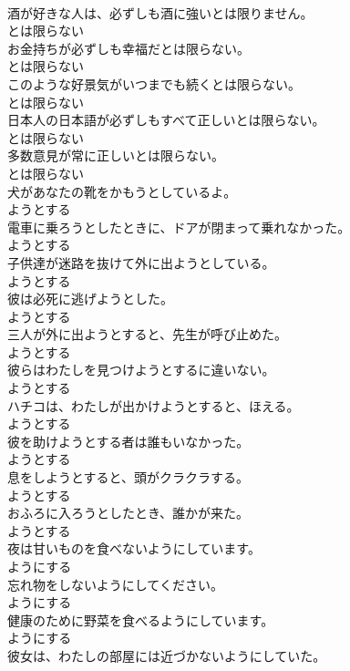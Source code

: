 \documentclass[8pt]{extreport}
\begin{document}
\begin{CJK}{UTF8}{min}
\\	酒が好きな人は、必ずしも酒に強いとは限りません。	
\\	とは限らない
\\	お金持ちが必ずしも幸福だとは限らない。	
\\	とは限らない
\\	このような好景気がいつまでも続くとは限らない。	
\\	とは限らない
\\	日本人の日本語が必ずしもすべて正しいとは限らない。	
\\	とは限らない
\\	多数意見が常に正しいとは限らない。	
\\	とは限らない
\\	犬があなたの靴をかもうとしているよ。	
\\	ようとする
\\	電車に乗ろうとしたときに、ドアが閉まって乗れなかった。	
\\	ようとする
\\	子供達が迷路を抜けて外に出ようとしている。	
\\	ようとする
\\	彼は必死に逃げようとした。	
\\	ようとする
\\	三人が外に出ようとすると、先生が呼び止めた。	
\\	ようとする
\\	彼らはわたしを見つけようとするに違いない。	
\\	ようとする
\\	ハチコは、わたしが出かけようとすると、ほえる。	
\\	ようとする
\\	彼を助けようとする者は誰もいなかった。	
\\	ようとする
\\	息をしようとすると、頭がクラクラする。	
\\	ようとする
\\	おふろに入ろうとしたとき、誰かが来た。	
\\	ようとする
\\	夜は甘いものを食べないようにしています。	
\\	ようにする
\\	忘れ物をしないようにしてください。	
\\	ようにする
\\	健康のために野菜を食べるようにしています。	
\\	ようにする
\\	彼女は、わたしの部屋には近づかないようにしていた。	

\end{CJK}
\end{document}
